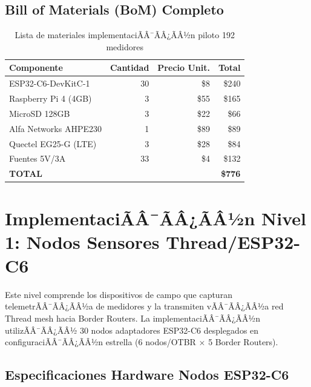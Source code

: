 \subsection{Bill of Materials (BoM) Completo}

\begin{table}[h]
\centering
\caption{Lista de materiales implementaciÃÂ¯ÃÂ¿ÃÂ½n piloto 192 medidores}
\label{tab:impl-bom}
\begin{tabular}{|l|r|r|r|}
\hline
\textbf{Componente} & \textbf{Cantidad} & \textbf{Precio Unit.} & \textbf{Total} \\
\hline
ESP32-C6-DevKitC-1 & 30 & \$8 & \$240 \\
\hline
Raspberry Pi 4 (4GB) & 3 & \$55 & \$165 \\
\hline
MicroSD 128GB & 3 & \$22 & \$66 \\
\hline
Alfa Networks AHPE230 & 1 & \$89 & \$89 \\
\hline
Quectel EG25-G (LTE) & 3 & \$28 & \$84 \\
\hline
Fuentes 5V/3A & 33 & \$4 & \$132 \\
\hline
\textbf{TOTAL} & & & \textbf{\$776} \\
\hline
\end{tabular}
\end{table}

\section{ImplementaciÃÂ¯ÃÂ¿ÃÂ½n Nivel 1: Nodos Sensores Thread/ESP32-C6}
\label{sec:impl-nivel1-nodos}

Este nivel comprende los dispositivos de campo que capturan telemetrÃÂ¯ÃÂ¿ÃÂ½a de medidores y la transmiten vÃÂ¯ÃÂ¿ÃÂ½a red Thread mesh hacia Border Routers. La implementaciÃÂ¯ÃÂ¿ÃÂ½n utilizÃÂ¯ÃÂ¿ÃÂ½ 30 nodos adaptadores ESP32-C6 desplegados en configuraciÃÂ¯ÃÂ¿ÃÂ½n estrella (6 nodos/OTBR $\times$ 5 Border Routers).

\subsection{Especificaciones Hardware Nodos ESP32-C6}
\label{sec:impl-nodos-hw}

